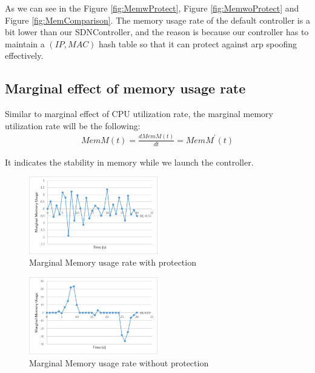 \documentclass[conference]{IEEEtran}
\begin{document}
As we can see in the Figure \ref{fig:MemwProtect}, Figure \ref{fig:MemwoProtect} and Figure \ref{fig:MemComparison}. The memory usage rate of the default controller is a bit lower than our SDNController, and the reason is because our controller has to maintain a $(IP, MAC)$ hash table so that it can protect against arp spoofing effectively. 

\subsection{Marginal effect of memory usage rate}
Similar to marginal effect of CPU utilization rate, the marginal memory utilization rate will be the following:
\begin{align}
    MemM(t) = \frac{dMemM(t)}{dt}=MemM^{'}(t)
\end{align}

It indicates the stability in memory while we launch the controller. 

\begin{figure}[h!]
\includegraphics[width=0.5\textwidth]{MarginalMemwProtect.png}
\caption{Marginal Memory usage rate with protection}
\label{fig:MarginalMemwProtect}
\end{figure}

\begin{figure}[h!]
\includegraphics[width=0.5\textwidth]{MarginalMemwoProtect.png}
\caption{Marginal Memory usage rate without protection}
\label{fig:MarginalMemwoProtect}
\end{figure}
\end{document}

